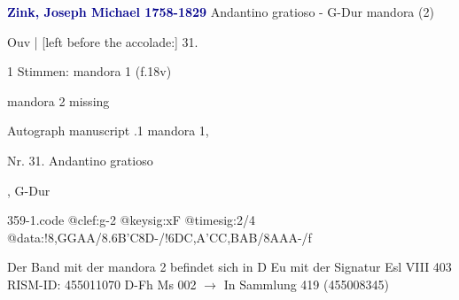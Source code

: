 \documentclass[twocolumn]{book}
\begin{document}
\newline \par \vspace{7pt} \textcolor{darkblue}{\textbf{Zink, Joseph Michael  1758-1829}}
\newline Andantino gratioso - G-Dur
\newline mandora (2)
\newline \begin{itshape}[f.18v, at left:] Ouv | [left before the accolade:] 31.\end{itshape} 
\newline \textcolor{darkblue}{}  1 Stimmen: mandora 1  (f.18v)
\newline \begin{small} mandora 2 missing\end{small} 
\newline Autograph manuscript
.1  mandora 1, \begin{itshape}Nr. 31. Andantino gratioso\end{itshape}, G-Dur  
\begin{filecontents*}{359-1.code}
@clef:g-2
@keysig:xF
@timesig:2/4
@data:!8,GGAA/{8.6B'C}8D-/!{6DC}{,A'C}{C,B}{AB}/8AAA-/f
\end{filecontents*}
\newline
%
\newline Der Band mit der mandora 2 befindet sich in D Eu mit der Signatur Esl VIII 403
\newline RISM-ID: 455011070
\newline D-Fh  Ms 002
\newline $\rightarrow$ In Sammlung 419 (455008345)
      
\end{document}
